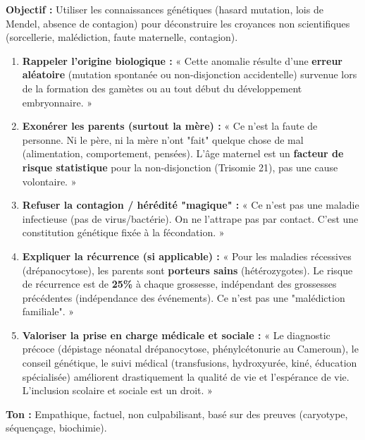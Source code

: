 \documentclass[11pt]{article}
\begin{document}
\begin{methode}
    \textbf{Objectif :} Utiliser les connaissances génétiques (hasard mutation, lois de Mendel, absence de contagion) pour déconstruire les croyances non scientifiques (sorcellerie, malédiction, faute maternelle, contagion).
    \begin{enumerate}
        \item \textbf{Rappeler l'origine biologique :} « Cette anomalie résulte d'une \textbf{erreur aléatoire} (mutation spontanée ou non-disjonction accidentelle) survenue lors de la formation des gamètes ou au tout début du développement embryonnaire. »
        \item \textbf{Exonérer les parents (surtout la mère) :} « Ce n'est la faute de personne. Ni le père, ni la mère n'ont "fait" quelque chose de mal (alimentation, comportement, pensées). L'âge maternel est un \textbf{facteur de risque statistique} pour la non-disjonction (Trisomie 21), pas une cause volontaire. »
        \item \textbf{Refuser la contagion / hérédité "magique" :} « Ce n'est pas une maladie infectieuse (pas de virus/bactérie). On ne l'attrape pas par contact. C'est une constitution génétique fixée à la fécondation. »
        \item \textbf{Expliquer la récurrence (si applicable) :} « Pour les maladies récessives (drépanocytose), les parents sont \textbf{porteurs sains} (hétérozygotes). Le risque de récurrence est de \textbf{25\%} à chaque grossesse, indépendant des grossesses précédentes (indépendance des événements). Ce n'est pas une "malédiction familiale". »
        \item \textbf{Valoriser la prise en charge médicale et sociale :} « Le diagnostic précoce (dépistage néonatal drépanocytose, phénylcétonurie au Cameroun), le conseil génétique, le suivi médical (transfusions, hydroxyurée, kiné, éducation spécialisée) améliorent drastiquement la qualité de vie et l'espérance de vie. L'inclusion scolaire et sociale est un droit. »
    \end{enumerate}
    \textbf{Ton :} Empathique, factuel, non culpabilisant, basé sur des preuves (caryotype, séquençage, biochimie).
\end{methode}
\end{document}

